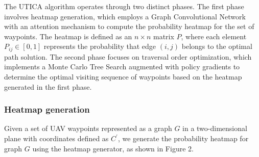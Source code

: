 \documentclass[sigconf]{acmart}
\begin{document}
The UTICA algorithm operates through two distinct phases. The first phase involves heatmap generation, which employs a Graph Convolutional Network with an attention mechanism to compute the probability heatmap for the set of waypoints. The heatmap is defined as an $n\times n$ matrix $P$, where each element $P_{ij}\in[0,1]$ represents the probability that edge $(i,j)$ belongs to the optimal path solution. The second phase focuses on traversal order optimization, which implements a Monte Carlo Tree Search augmented with policy gradients to determine the optimal visiting sequence of waypoints based on the heatmap generated in the first phase.





\subsubsection{Heatmap generation}
Given a set of UAV waypoints represented as a graph $G$ in a two-dimensional plane with coordinates defined as $C^{\prime}$, we generate the probability heatmap for graph $G$ using the heatmap generator, as shown in Figure 2.


\end{document}
